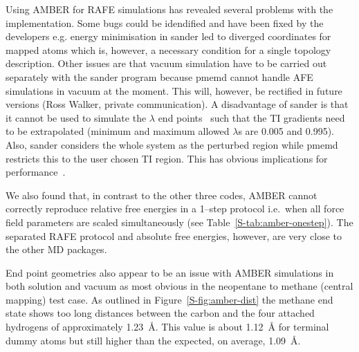 \documentclass[journal=jctcce,manuscript=article]{achemso}
\begin{document}
Using AMBER for RAFE simulations has revealed several problems with
the implementation.  Some bugs could be idendified and have been fixed
by the developers e.g. energy minimisation in sander led to diverged
coordinates for mapped atoms which is, however, a necessary condition
for a single topology description.  Other issues are that vacuum
simulation have to be carried out separately with the sander program
because pmemd cannot handle AFE simulations in vacuum at the moment.  This will, however, be rectified in future versions (Ross Walker, private communication).  A disadvantage of sander is that it cannot be used to simulate the $\lambda$ end points~\cite{doi:10.1021/ct400340s} such that the TI gradients need to be extrapolated (minimum and maximum allowed $\lambda$s are 0.005 and 0.995).  Also, sander considers the whole system as the perturbed
region while pmemd restricts this to the user chosen TI region.  This
has obvious implications for performance~\cite{doi:10.1021/ct400340s}.

We also found that, in contrast to the other three codes, AMBER cannot
correctly reproduce relative free energies in a 1--step protocol i.e.\
when all force field parameters are scaled simultaneously (see Table~\ref{S-tab:amber-onestep}).  The separated RAFE protocol and absolute free energies, however, are very close to the other MD packages.

End point geometries also appear to be an issue with AMBER simulations
in both solution and vacuum as most obvious in the neopentane to
methane (central mapping) test case.  As outlined in Figure~\ref{S-fig:amber-dist} the
methane end state shows too long distances between the carbon and the
four attached hydrogens of approximately \SI{1.23}{\angstrom}.  This
value is about \SI{1.12}{\angstrom} for terminal dummy atoms but still
higher than the expected, on average, \SI{1.09}{\angstrom}.
\end{document}
